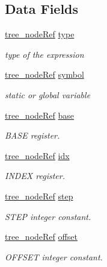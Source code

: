 \subsection*{Data Fields}
\begin{DoxyCompactItemize}
\item 
\hyperlink{tree__node_8hpp_a6ee377554d1c4871ad66a337eaa67fd5}{tree\+\_\+node\+Ref} \hyperlink{structtarget__mem__ref_a8496a1b5799d861c11ae536c6e3b88ec}{type}
\begin{DoxyCompactList}\small\item\em type of the expression \end{DoxyCompactList}\item 
\hyperlink{tree__node_8hpp_a6ee377554d1c4871ad66a337eaa67fd5}{tree\+\_\+node\+Ref} \hyperlink{structtarget__mem__ref_af4ff7733b30e80c001a404f2b0662db9}{symbol}
\begin{DoxyCompactList}\small\item\em static or global variable \end{DoxyCompactList}\item 
\hyperlink{tree__node_8hpp_a6ee377554d1c4871ad66a337eaa67fd5}{tree\+\_\+node\+Ref} \hyperlink{structtarget__mem__ref_a78910b23b0a6c9cfbb0f1484bf08846e}{base}
\begin{DoxyCompactList}\small\item\em B\+A\+SE register. \end{DoxyCompactList}\item 
\hyperlink{tree__node_8hpp_a6ee377554d1c4871ad66a337eaa67fd5}{tree\+\_\+node\+Ref} \hyperlink{structtarget__mem__ref_a0f9e445f332c9d78c813bae0dd7f7933}{idx}
\begin{DoxyCompactList}\small\item\em I\+N\+D\+EX register. \end{DoxyCompactList}\item 
\hyperlink{tree__node_8hpp_a6ee377554d1c4871ad66a337eaa67fd5}{tree\+\_\+node\+Ref} \hyperlink{structtarget__mem__ref_a604fd352b54fdea34609be7f9da5afaf}{step}
\begin{DoxyCompactList}\small\item\em S\+T\+EP integer constant. \end{DoxyCompactList}\item 
\hyperlink{tree__node_8hpp_a6ee377554d1c4871ad66a337eaa67fd5}{tree\+\_\+node\+Ref} \hyperlink{structtarget__mem__ref_a9c343bbc08697878aede0e01284e127a}{offset}
\begin{DoxyCompactList}\small\item\em O\+F\+F\+S\+ET integer constant. \end{DoxyCompactList}\item 

\end{DoxyCompactItemize}
